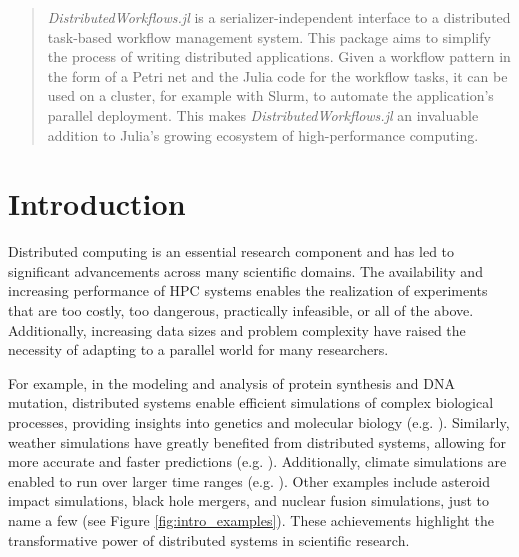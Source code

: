 \documentclass{juliacon}
\begin{document}


\maketitle


\begin{abstract}
\emph{DistributedWorkflows.jl} is a serializer-independent interface to a distributed task-based workflow management system.
This package aims to simplify the process of writing distributed applications.
Given a workflow pattern in the form of a Petri net and the Julia code for the workflow tasks, it can be used on a cluster, for example with Slurm, to automate the application's parallel deployment. 
This makes \emph{DistributedWorkflows.jl} an invaluable addition to Julia's growing ecosystem of high-performance computing.
\end{abstract}


\section{Introduction}
\label{sec:introduction}

Distributed computing is an essential research component and has led to significant advancements across many scientific domains.
The availability and increasing performance of HPC systems enables the realization of experiments that are too costly, too dangerous, practically infeasible, or all of the above.
Additionally, increasing data sizes and problem complexity have raised the necessity of adapting to a parallel world for many researchers.\vskip 6pt

For example, in the modeling and analysis of protein synthesis and DNA mutation, distributed systems enable efficient simulations of complex biological processes, providing insights into genetics and molecular biology (e.g. \cite{biology_example_petrinets_openaccess}).
Similarly, weather simulations have greatly benefited from distributed systems, allowing for more accurate and faster predictions (e.g. \cite{WeatherForcast_HPC_paper}).
Additionally, climate simulations are enabled to run over larger time ranges (e.g. \cite{TheJuly2019EuropeanHeatWaveinaWarmerClimateStorylineScenarioswithaCoupledModelUsingSpectralNudging}).
Other examples include asteroid impact simulations\cite{asteroid_vis_paper}, black hole mergers\cite{blackhole_merger}, and nuclear fusion simulations\cite{in_situ_visualization_large_scale_fusion_simulation}, just to name a few (see Figure \ref{fig:intro_examples}).
These achievements highlight the transformative power of distributed systems in scientific research.\vskip 6pt
\end{document}
